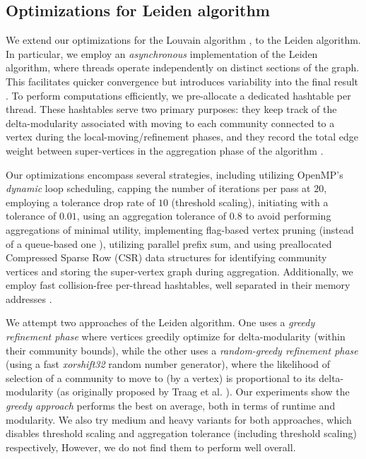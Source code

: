 \subsection{Optimizations for Leiden algorithm}
\label{sec:leiden}

We extend our optimizations for the Louvain algorithm \cite{sahu2023gvelouvain}, to the Leiden algorithm. In particular, we employ an \textit{asynchronous} implementation of the Leiden algorithm, where threads operate independently on distinct sections of the graph. This facilitates quicker convergence but introduces variability into the final result \cite{com-shi21}. To perform computations efficiently, we pre-allocate a dedicated hashtable per thread. These hashtables serve two primary purposes: they keep track of the delta-modularity associated with moving to each community connected to a vertex during the local-moving/refinement phases, and they record the total edge weight between super-vertices in the aggregation phase of the algorithm \cite{sahu2023gvelouvain}.

Our optimizations encompass several strategies, including utilizing OpenMP's \textit{dynamic} loop scheduling, capping the number of iterations per pass at $20$, employing a tolerance drop rate of $10$ (threshold scaling), initiating with a tolerance of $0.01$, using an aggregation tolerance of $0.8$ to avoid performing aggregations of minimal utility, implementing flag-based vertex pruning (instead of a queue-based one \cite{nguyenleiden}), utilizing parallel prefix sum, and using preallocated Compressed Sparse Row (CSR) data structures for identifying community vertices and storing the super-vertex graph during aggregation. Additionally, we employ fast collision-free per-thread hashtables, well separated in their memory addresses \cite{sahu2023gvelouvain}.

We attempt two approaches of the Leiden algorithm. One uses a \textit{greedy refinement phase} where vertices greedily optimize for delta-modularity (within their community bounds), while the other uses a \textit{random-greedy refinement phase} (using a fast \textit{xorshift32} random number generator), where the likelihood of selection of a community to move to (by a vertex) is proportional to its delta-modularity (as originally proposed by Traag et al. \cite{com-traag19}). Our experiments show the \textit{greedy approach} performs the best on average, both in terms of runtime and modularity. We also try medium and heavy variants for both approaches, which disables threshold scaling and aggregation tolerance (including threshold scaling) respectively, However, we do not find them to perform well overall.

